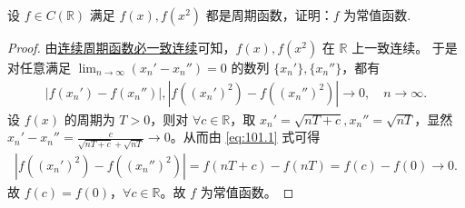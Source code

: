 \documentclass[../../main.tex]{subfiles}%
\begin{document}
\begin{example}
设 \(f \in C(\mathbb{R})\) 满足 \(f(x), f(x^2)\) 都是周期函数，证明：\(f\) 为常值函数. 
\end{example}
\begin{proof}

由\hyperref[proposition:连续周期函数必一致连续]{连续周期函数必一致连续}可知，\(f(x),f(x^2)\) 在 \(\mathbb{R}\) 上一致连续。
于是对任意满足 \(\lim_{n \to \infty} (x_n' - x_n'') = 0\) 的数列 \(\{x_n'\}, \{x_n''\}\)，都有
\begin{align}
|f(x_n') - f(x_n'')|, |f((x_n')^2) - f((x_n'')^2)| \to 0, \quad n \to \infty. \label{eq:101.1}
\end{align}
设 \(f(x)\) 的周期为 \(T > 0\)，则对 \(\forall c \in \mathbb{R}\)，取 \(x_n' = \sqrt{nT + c}, x_n'' = \sqrt{nT}\)，显然 \(x_n' - x_n'' = \frac{c}{\sqrt{nT + c} + \sqrt{nT}} \to 0\)。从而由 \eqref{eq:101.1} 式可得
\begin{align*}
|f((x_n')^2) - f((x_n'')^2)| = f(nT + c) - f(nT) = f(c) - f(0) \to 0.
\end{align*}
故 \(f(c) = f(0)\)，\(\forall c \in \mathbb{R}\)。故 \(f\) 为常值函数。

\end{proof}
\end{document}
